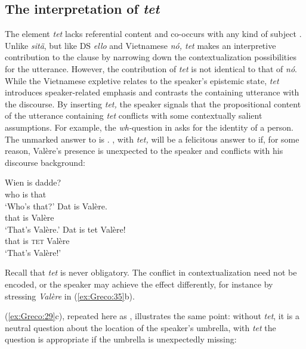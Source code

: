 \documentclass[output=paper]{LSP/langsci}
\begin{document}
\subsection{The interpretation of \textit{tet}}\label{sec:Greco:5.2.}
The element \textit{tet} lacks referential content and co-occurs with any kind of subject \citep{Haegeman2008}. Unlike  \textit{sitä}, but like DS \textit{ello} and Vietnamese\textit{ nó, tet} makes an interpretive contribution to the clause by narrowing down the contextualization possibilities for the utterance. However, the  contribution of \textit{tet} is not identical to that of \textit{nó}. While the Vietnamese expletive relates to the speaker’s epistemic state, \textit{tet} introduces speaker-related emphasis and contrasts the containing utterance with the discourse. By inserting \textit{tet,} the speaker signals that the propositional content of the utterance containing \textit{tet} conflicts with some contextually salient assumptions. For example, the \textit{wh-}question in  asks for the identity of a person. The unmarked answer to  is . , with \textit{tet,} will be a felicitous answer to  if, for some reason, Valère’s presence is unexpected to the speaker and conflicts with his discourse background:


\ea%
    \label{ex:Greco:35}
    \ea \label{ex:Greco:35a} \gll Wien is dadde?\\
    		 who   is that\\
		\glt ‘Who’s that?’
	\ex     \label{ex:Greco:35b} \gll Dat   is Valère.\\
		     that   is Valère\\
		\glt ‘That’s Valère.’
	\ex     \label{ex:Greco:35c} \gll Dat   is tet   Valère!\\
		     that   is \textsc{tet}  Valère \\
		\glt ‘That’s Valère!’
	\z
\z

Recall that \textit{tet} is never obligatory. The conflict in contextualization need not be encoded, or the speaker may achieve the effect differently, for instance by stressing \textit{Valère} in (\ref{ex:Greco:35}b).


(\ref{ex:Greco:29}c), repeated here as , illustrates the same point: without \textit{tet}, it is a neutral question about the location of the speaker’s umbrella, with \textit{tet} the question is appropriate if the umbrella is unexpectedly missing:
\end{document}
